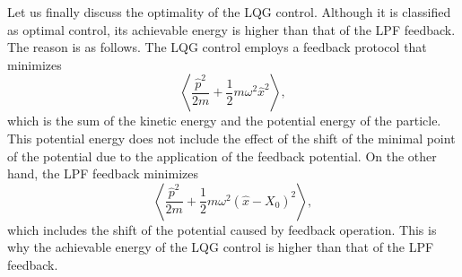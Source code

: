 \documentclass[aps,pra,superscriptaddress,twocolumn
]{revtex4-2}
\newcommand{\majrev}[1]{{#1}}
\begin{document}
 Let us finally discuss the optimality of the LQG control. 
 Although it is classified as optimal control, its
 achievable energy is higher than that of the LPF feedback.
 The reason is as follows.
 The LQG control employs a feedback protocol 
 that minimizes
 \begin{equation}
  \left\langle \frac{\hat p^2}{2m} + \frac{1}{2}m\omega^2 \hat x^2\right\rangle  , \label{eq:031301}
 \end{equation}
 which is the sum of the kinetic energy and the potential energy of the particle.
 This potential energy does not include the effect of the shift of the minimal point of the potential 
 due to the application of the feedback potential.
 On the other hand, the LPF feedback minimizes
 \begin{equation}
  \left\langle \frac{\hat p^2}{2m} + \frac{1}{2}m\omega^2 (\hat x-X_0)^2\right\rangle,
 \end{equation}
 which includes the shift of the potential \majrev{caused by 
 feedback operation}.
 This is why the achievable energy of the LQG control 
 is higher than that of the LPF feedback.
 
 
\end{document}
